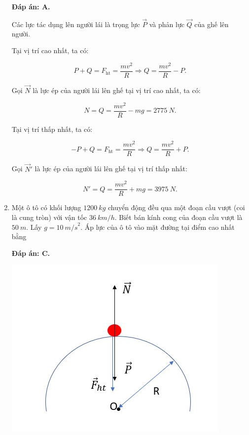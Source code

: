 \begin{enumerate}[label=\bfseries Câu \arabic*:]
	\hideall
	{	
		\textbf{Đáp án: A.}
		
		Các lực tác dụng lên người lái là trọng lực $\vec P$ và phản lực $\vec Q$ của ghế lên người.
		
		Tại vị trí cao nhất, ta có:
		
		$$P + Q = F_\text{ht} = \dfrac{mv^2}{R} \Rightarrow Q = \dfrac{mv^2}{R} - P.$$
		
		
		Gọi $\vec N$ là lực ép của người lái lên ghế tại vị trí cao nhất, ta có:
		
		$$N = Q = \dfrac{mv^2}{R} - mg = \SI{2775}{N}.$$
		
		Tại vị trí thấp nhất, ta có:
		
		$$ - P + Q = F_\text{ht} = \dfrac{mv^2}{R} \Rightarrow Q = \dfrac{mv^2}{R} + P.$$
		
		Gọi $\vec N'$ là lực ép của người lái lên ghế tại vị trí thấp nhất:
		
		$$N' = Q = \dfrac{mv^2}{R} + mg = \SI{3975}{N}.$$
	}
	\item {}
	
	
	{Một ô tô có khối lượng $\SI{1200}{kg}$ chuyển động đều qua một đoạn cầu vượt (coi là cung tròn) với vận tốc $\SI{36}{km/h}$. Biết bán kính cong của đoạn cầu vượt là $\SI{50}{m}$. Lấy $g = \SI{10}{m/s}^2$. Áp lực của ô tô vào mặt đường tại điểm cao nhất bằng 
	}
	
	\hideall
	{	
		\textbf{Đáp án: C.}
		
		\begin{center}
			\includegraphics[scale=0.6]{../figs/VN10-2022-PH-TP0005-2.jpg}
		\end{center}
		
}
\end{enumerate}
